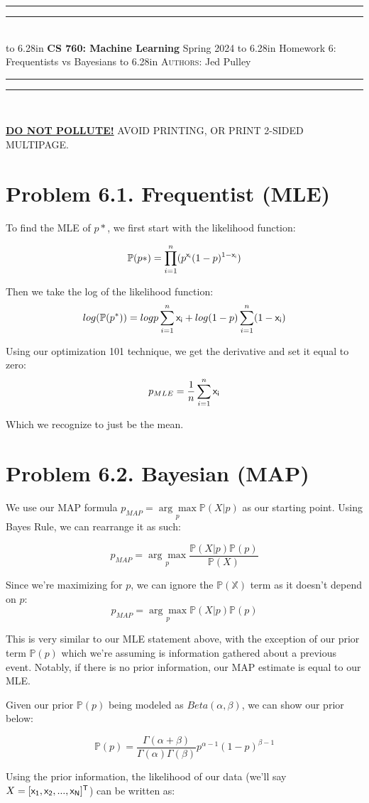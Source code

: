 \documentclass{article}
\newcommand{\lecture}[2]{
\pagestyle{myheadings}
\thispagestyle{plain}
\newpage
\noindent
\begin{center}
\rule{\textwidth}{1.6pt}\vspace*{-\baselineskip}\vspace*{2pt} %
\rule{\textwidth}{0.4pt}\\[1\baselineskip] %
\vbox{\vspace{2mm}
\hbox to 6.28in { {\bf CS 760: Machine Learning} \hfill Spring 2024 }
\vspace{4mm}
\hbox to 6.28in { {\Large \hfill #1  \hfill} }
\vspace{4mm}
\hbox to 6.28in { {\scshape Authors:}  #2 \hfill }}
\vspace{-2mm}
\rule{\textwidth}{0.4pt}\vspace*{-\baselineskip}\vspace{3.2pt} %
\rule{\textwidth}{1.6pt}\\[\baselineskip] %
\end{center}
\vspace*{4mm}
}
\begin{document}
\lecture{Homework 6: Frequentists vs Bayesians}{Jed Pulley}

\begin{center}
{\Large {\sf \underline{\textbf{DO NOT POLLUTE!}} AVOID PRINTING, OR PRINT 2-SIDED MULTIPAGE.}}
\end{center}

\section*{Problem 6.1. Frequentist (MLE)}
To find the MLE of $p*$, we first start with the likelihood function:

  \[\mathbb{P}(p*) = \prod^n_{i=1} (p^{\sf{x}_i} (1 - p)^{1 - \sf{x}_i})\]

Then we take the log of the likelihood function:
  \[ log(\mathbb{P}(p^*)) = logp \sum_{i=1}^{n} {\sf{x}_i} + log (1 - p) \sum_{i=1}^{n}(1 - {\sf{x}_i}) \]

Using our optimization 101 technique, we get the derivative and set it equal to zero:
  \[ p_{MLE} = \frac{1}{n} \sum_{i=1}^{n} \sf{x}_i \]

Which we recognize to just be the mean.

\section*{Problem 6.2. Bayesian (MAP)}
We use our MAP formula $p_{MAP} = \underset{p}{\arg\max} \mathbb{P}(X | p)$ as our starting point. Using Bayes Rule, we can rearrange it as such:

\[ p_{MAP} = \underset{p}{\arg\max} \frac{\mathbb{P}(X | p) \mathbb{P}(p)}{\mathbb{P}(X)} \]

Since we're maximizing for $p$, we can ignore the $\mathbb{P(X)}$ term as it doesn't depend on $p$:
\[ p_{MAP} = \underset{p}{\arg\max} \mathbb{P}(X | p) \mathbb{P}(p)\]

This is very similar to our MLE statement above, with the exception of our prior term $\mathbb{P}(p)$ which we're assuming is information gathered about a previous event. Notably, if there is no prior information, our MAP estimate is equal to our MLE.

Given our prior $\mathbb{P}(p)$ being modeled as $Beta(\alpha, \beta)$, we can show our prior below:

\[ \mathbb{P}(p) = \frac{\Gamma(\alpha + \beta)}{\Gamma(\alpha)\Gamma(\beta)}p^{\alpha - 1}(1 - p)^{\beta - 1} \]

Using the prior information, the likelihood of our data (we'll say $X = [\sf{x}_1, \sf{x}_2, ..., \sf{x}_N]^{\sf{T}}$) can be written as:
\end{document}
